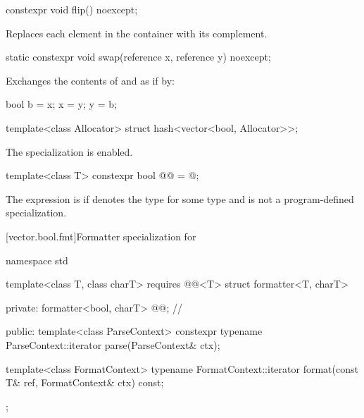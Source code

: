 %
\begin{itemdecl}
constexpr void flip() noexcept;
\end{itemdecl}

\begin{itemdescr}
\pnum
\effects
Replaces each element in the container with its complement.
\end{itemdescr}

%
\begin{itemdecl}
static constexpr void swap(reference x, reference y) noexcept;
\end{itemdecl}

\begin{itemdescr}
\pnum
\effects
Exchanges the contents of  and  as if by:

\begin{codeblock}
bool b = x;
x = y;
y = b;
\end{codeblock}

\end{itemdescr}

\begin{itemdecl}
template<class Allocator> struct hash<vector<bool, Allocator>>;
\end{itemdecl}

\begin{itemdescr}
\pnum
The specialization is enabled.
\end{itemdescr}

%
\begin{itemdecl}
template<class T>
  constexpr bool @@ = @\seebelow@;
\end{itemdecl}

\begin{itemdescr}
\pnum
The expression
 is 
if  denotes the type 
for some type  and
 is not a program-defined specialization.
\end{itemdescr}

[vector.bool.fmt]{Formatter specialization for }

%
\begin{codeblock}
namespace std {
  template<class T, class charT>
    requires @@<T>
  struct formatter<T, charT> {
  private:
    formatter<bool, charT> @@;       // \expos

  public:
    template<class ParseContext>
      constexpr typename ParseContext::iterator
        parse(ParseContext& ctx);

    template<class FormatContext>
      typename FormatContext::iterator
        format(const T& ref, FormatContext& ctx) const;
  };
}
\end{codeblock}

